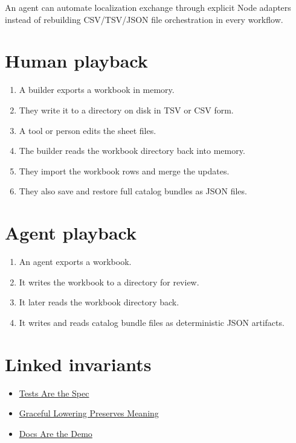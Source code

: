 An agent can automate localization exchange through explicit Node adapters instead of rebuilding CSV/TSV/JSON file orchestration in every workflow.

\section{Human playback}\label{record-192-human-playback}

\begin{enumerate}
\def\labelenumi{\arabic{enumi}.}
\tightlist
\item
  A builder exports a workbook in memory.
\item
  They write it to a directory on disk in TSV or CSV form.
\item
  A tool or person edits the sheet files.
\item
  The builder reads the workbook directory back into memory.
\item
  They import the workbook rows and merge the updates.
\item
  They also save and restore full catalog bundles as JSON files.
\end{enumerate}

\section{Agent playback}\label{record-192-agent-playback}

\begin{enumerate}
\def\labelenumi{\arabic{enumi}.}
\tightlist
\item
  An agent exports a workbook.
\item
  It writes the workbook to a directory for review.
\item
  It later reads the workbook directory back.
\item
  It writes and reads catalog bundle files as deterministic JSON artifacts.
\end{enumerate}

\section{Linked invariants}\label{record-192-linked-invariants}

\begin{itemize}
\tightlist
\item
  \href{https://github.com/flyingrobots/bijou/blob/cbd70612140e7a450d764b3c7be1c6af878b99bc/docs/invariants/tests-are-the-spec.md}{Tests Are the Spec}
\item
  \href{https://github.com/flyingrobots/bijou/blob/cbd70612140e7a450d764b3c7be1c6af878b99bc/docs/invariants/graceful-lowering-preserves-meaning.md}{Graceful Lowering Preserves Meaning}
\item
  \href{https://github.com/flyingrobots/bijou/blob/cbd70612140e7a450d764b3c7be1c6af878b99bc/docs/invariants/docs-are-the-demo.md}{Docs Are the Demo}
\end{itemize}

